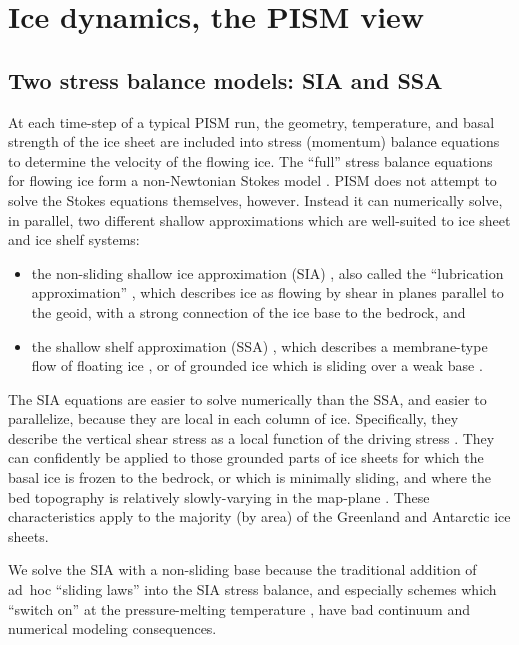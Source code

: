 \section{Ice dynamics, the PISM view}\label{sec:dynamics}

\subsection{Two stress balance models: SIA and SSA}  At each time-step of a typical PISM run, the geometry, temperature, and basal strength of the ice sheet are included into stress (momentum) balance equations to determine the velocity of the flowing ice.   The ``full'' stress balance equations for flowing ice form a non-Newtonian Stokes model \cite{Fowler}.  PISM does not attempt to solve the Stokes equations themselves, however.  Instead it can numerically solve, in parallel, two different shallow approximations which are well-suited to ice sheet and ice shelf systems:
\begin{itemize}
\item the non-sliding shallow ice approximation (SIA) \cite{Hutter}, also called the ``lubrication approximation'' \cite{Fowler}, which describes ice as flowing by shear in planes parallel to the geoid, with a strong connection of the ice base to the bedrock, and
\item the shallow shelf approximation (SSA) \cite{WeisGreveHutter}, which describes a membrane-type flow of floating ice \cite{Morland}, or of grounded ice which is sliding over a weak base \cite{MacAyeal,SchoofStream}.
\end{itemize}

The SIA equations are easier to solve numerically than the SSA, and easier to parallelize, because they are local in each column of ice.  Specifically, they describe the vertical shear stress as a local function of the driving stress \cite{Paterson}.  They can confidently be applied to those grounded parts of ice sheets for which the basal ice is frozen to the bedrock, or which is minimally sliding, and where the bed topography is relatively slowly-varying in the map-plane \cite{Fowler}.  These characteristics apply to the majority (by area) of the Greenland and Antarctic ice sheets.

We solve the SIA with a non-sliding base because the traditional \cite{Greve,HuybrechtsdeWolde,PayneBaldwin} addition of ad~hoc ``sliding laws'' into the SIA stress balance, and especially schemes which ``switch on'' at the pressure-melting temperature \cite{EISMINT00}, have bad continuum  \cite{Fowler01} and numerical \cite[appendix B]{BBssasliding} modeling consequences.

